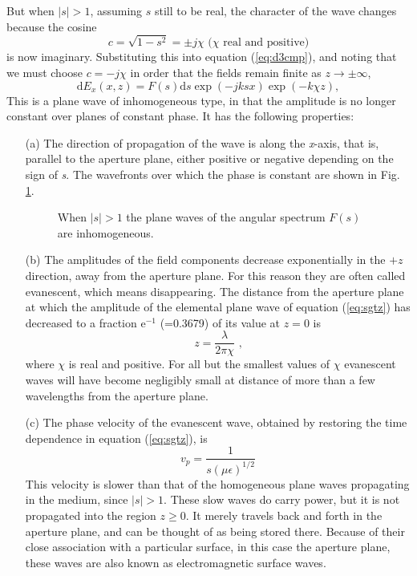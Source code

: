 But when $|s|>1$, assuming $s$ still to be real, the character of the wave changes because the cosine
\begin{equation}
c=\sqrt{1-s^2}=\pm j\chi \text{  ($\chi$ real and positive)}
\end{equation}
is now imaginary. Substituting this into equation (\ref{eq:d3cmp}), and noting that we must choose $c=-j\chi$ in order that the fields remain finite as $z\rightarrow\pm\infty$,
\begin{equation}
\mathrm{d}E_x(x,z)=F(s)\mathrm{d}s\exp(-jksx)\exp(-k\chi z),
\label{eq:sgtz}
\end{equation}
This is a plane wave of inhomogeneous type, in that the amplitude is no longer constant over planes of constant phase. It has the following properties:
\begin{itemize}
	\item[(a)]
	The direction of propagation of the wave is along the \textit{x}-axis, that is, parallel to the aperture plane, either positive or negative depending on the sign of \textit{s}. The wavefronts over which the phase is constant are shown in Fig. \ref{fig:sgtz}.
	\begin{figure}[htbp]
		\begin{center}
		\end{center}
		\caption{When $|s|>1$ the plane waves of the angular spectrum $F(s)$ are inhomogeneous.}
		\label{fig:sgtz}
	\end{figure}
	\item[(b)]
	The amplitudes of the field components decrease exponentially in the $+z$ direction, away from the aperture plane. For this reason they are often called evanescent, which means disappearing. The distance from the aperture plane at which the amplitude of the elemental plane wave of equation (\ref{eq:sgtz}) has decreased to a fraction $\mathrm{e}^{-1}$ (=0.3679) of its value at $z=0$ is
	\begin{equation}
	z=\dfrac{\lambda}{2\pi\chi}\text{  ,}
	\end{equation}
	where $\chi$ is real and positive. For all but the smallest values of $\chi$ evanescent waves will have become negligibly small at distance of more than a few wavelengths from the aperture plane.
	\item[(c)]
	The phase velocity of the evanescent wave, obtained by restoring the time dependence in equation (\ref{eq:sgtz}), is
	\begin{equation}
	v_p=\dfrac{1}{s(\mu\epsilon)^{1/2}}
	\end{equation}
	This velocity is slower than that of the homogeneous plane waves propagating in the medium, since $|s|>1$. These slow waves do carry power, but it is not propagated into the region $z\geqslant0$. It merely travels back and forth in the aperture plane, and can be thought of as being stored there. Because of their close association with a particular surface, in this case the aperture plane, these waves are also known as electromagnetic surface waves.
\end{itemize}

